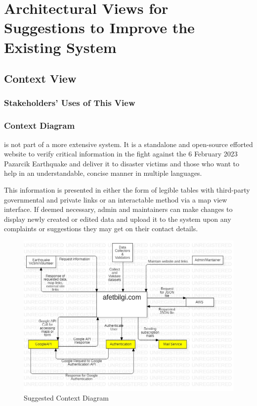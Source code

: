 \section{Architectural Views for Suggestions to Improve the Existing System}

\subsection{Context View}

\subsubsection{Stakeholders' Uses of This View}

\subsubsection{Context Diagram}

\afetbilgi is not part of a more extensive system. It is a standalone and open-source efforted website to verify critical information in the fight against the 6 February 2023 Pazarcik Earthquake and deliver it to disaster victims and those who want to help in an understandable, concise manner in multiple languages.

This information is presented in either the form of legible tables with third-party governmental and private links or an interactable method via a map view interface. If deemed necessary, admin and maintainers can make changes to display newly created or edited data and upload it to the system upon any complaints or suggestions they may get on their contact details.

\begin{figure}[H]
  \centering
  \includegraphics[width=\linewidth]{img/context-diagram-s5.jpg}
  \caption{Suggested Context Diagram}
\end{figure}

